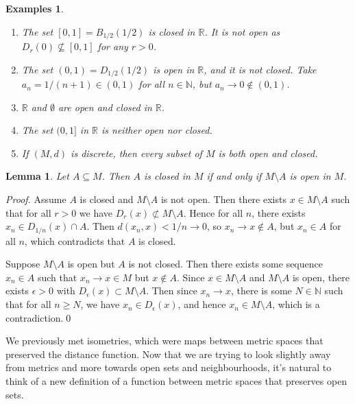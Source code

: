 \documentclass{article}
\theoremstyle{plain}\theoremheaderfont{\normalfont\itshape}\theorembodyfont{\rmfamily}\theoremseparator{.}\newtheorem*{rem}{Remark}\newtheorem*{ex}{Example}\newtheorem*{proof}{Proof}\newtheorem*{altp}{Alternative proof}
\theoremstyle{plain}\theoremheaderfont{\normalfont\bfseries}\theorembodyfont{\rmfamily}\theoremseparator{.}\newtheorem{thm}{Theorem}[section]\newtheorem{lem}[thm]{Lemma}\newtheorem{prop}[thm]{Proposition}\newtheorem*{cor}{Corollary}\newtheorem{defn}[thm]{Definition}\newtheorem{clm}[thm]{Claim}\newtheorem{clminproof}{Claim}
\theoremstyle{break}\theoremheaderfont{\normalfont\itshape}\theorembodyfont{\rmfamily}\theoremseparator{.\medskip}\newtheorem*{proofskip}{Proof}\newtheorem*{exs}{Examples}\newtheorem*{rems}{Remarks}
\theoremstyle{break}\theoremheaderfont{\normalfont\bfseries}\theorembodyfont{\rmfamily}\theoremseparator{.\medskip}\newtheorem{lemskip}[thm]{Lemma}\newtheorem{defnskip}[thm]{Definition}\newtheorem{propskip}[thm]{Proposition}\newtheorem{thmskip}[thm]{Theorem}
\newcommand{\qed}{\hfill\ensuremath{\Box}}
\begin{document}
    \begin{exs}
        \begin{enumerate}[label=(\roman*),topsep=0pt]
            \item The set \([0,1]=B_{1/2}(1/2)\) is closed in \(\mathbb{R}\). It is not open as \(D_r(0)\not\subseteq [0,1]\) for any \(r>0\).
            \item The set \((0,1)=D_{1/2}(1/2)\) is open in \(\mathbb{R}\), and it is not closed. Take \(a_n=1/(n+1)\in (0,1)\) for all \(n\in\mathbb{N}\), but \(a_n\to 0\not\in (0,1)\).
            \item \(\mathbb{R}\) and \(\emptyset\) are open and closed in \(\mathbb{R}\).
            \item The set \((0,1]\) in \(\mathbb{R}\) is neither open nor closed.
            \item If \((M,d)\) is discrete, then every subset of \(M\) is both open and closed.
        \end{enumerate}
    \end{exs}

    \begin{lem}
        Let \(A\subseteq M\). Then \(A\) is closed in \(M\) if and only if \(M\setminus A\) is open in \(M\).
    \end{lem}
    \begin{proof}
        Assume \(A\) is closed and \(M\setminus A\) is not open. Then there exists \(x\in M\setminus A\) such that for all \(r>0\) we have \(D_r(x)\not\subset M\setminus A\). Hence for all \(n\), there exists \(x_n\in D_{1/n}(x)\cap A\). Then \(d(x_n,x)<1/n\to 0\), so \(x_n\to x \not\in A\), but \(x_n\in A\) for all \(n\), which contradicts that \(A\) is closed.

        Suppose \(M\setminus A\) is open but \(A\) is not closed. Then there exists some sequence \(x_n\in A\) such that \(x_n\to x\in M\) but \(x\not\in A\). Since \(x\in M\setminus A\) and \(M\setminus A\) is open, there exists \(\epsilon>0\) with \(D_\epsilon(x)\subset M\setminus A\). Then since \(x_n\to x\), there is some \(N\in\mathbb{N}\) such that for all \(n\ge N\), we have \(x_n\in D_\epsilon(x)\), and hence \(x_n\in M\setminus A\), which is a contradiction.\qed
    \end{proof}

    We previously met isometries, which were maps between metric spaces that preserved the distance function. Now that we are trying to look slightly away from metrics and more towards open sets and neighbourhoods, it's natural to think of a new definition of a function between metric spaces that preserves open sets.
\end{document}

